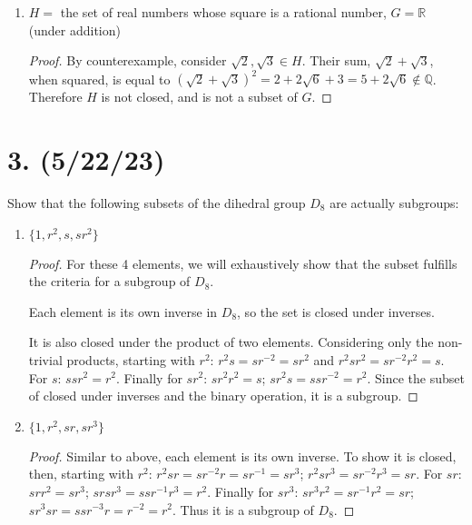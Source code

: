 \documentclass{article}
\begin{document}
\begin{enumerate}[label=(\alph*)]
\begin{proof}
          \end{proof}
    \item $H = $ the set of real numbers whose square is a rational number, $G = \mathbb{R}$ (under addition)
          \begin{proof}
            By counterexample, consider $\sqrt{2}, \sqrt{3} \in H$. Their sum, $\sqrt{2} + \sqrt{3}$, when squared, is equal to $(\sqrt{2} + \sqrt{3})^2 = 2 + 2\sqrt{6} + 3 = 5 + 2\sqrt{6} \notin \mathbb{Q}$. Therefore $H$ is not closed, and is not a subset of $G$.
          \end{proof}
\end{enumerate}

\section*{3. (5/22/23)}

Show that the following subsets of the dihedral group $D_8$ are actually subgroups:

\begin{enumerate}[label=(\alph*)]
    \item $\{ 1, r^2, s, sr^2 \}$
          \begin{proof}
            For these 4 elements, we will exhaustively show that the subset fulfills the criteria for a subgroup of $D_8$.

            Each element is its own inverse in $D_8$, so the set is closed under inverses.

            It is also closed under the product of two elements. Considering only the non-trivial products, starting with $r^2$: $r^2s = sr^{-2} = sr^2$ and $r^2sr^2 = sr^{-2}r^2 = s$. For $s$: $ssr^2 = r^2$. Finally for $sr^2$: $sr^2 r^2 = s$; $sr^2 s = ssr^{-2} = r^2$. Since the subset of closed under inverses and the binary operation, it is a subgroup.
          \end{proof}
    \item $\{ 1, r^2, sr, sr^3 \}$
          \begin{proof}
            Similar to above, each element is its own inverse. To show it is closed, then, starting with $r^2$: $r^2 sr = sr^{-2} r = sr^{-1} = sr^3$; $r^2 sr^3 = sr^{-2} r^3 = sr$. For $sr$: $sr r^2 = sr^3$; $sr sr^3 = ssr^{-1} r^3 = r^2$. Finally for $sr^3$: $sr^3 r^2 = sr^{-1} r^2 = sr$; $sr^3 sr = ss r^{-3} r = r^{-2} = r^2$. Thus it is a subgroup of $D_8$.
          \end{proof}
\end{enumerate}
\end{document}
